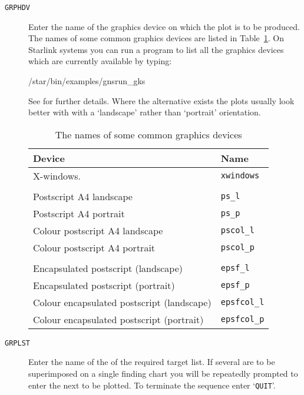 \documentclass[twoside,11pt]{starlink}
\begin{document}
\begin{description}

  \item[ \texttt{GRPHDV} ] Enter the name of the graphics device on which
   the plot is to be produced.  The names of some common graphics
   devices are listed in Table~\ref{GRPHDV}.  On Starlink systems you
   can run a program to list all the graphics devices which are
   currently available by typing:

  \begin{terminalv}
/star/bin/examples/gnsrun_gks
  \end{terminalv}

   See \cite{SUN57} for further details.  Where
   the alternative exists the plots usually look better with with a
   `landscape' rather than `portrait' orientation.

  \begin{table}[htbp]

  \begin{center}
  \begin{tabular}{ll}
   Device                         & Name             \\ \hline
   X-windows.                     & \texttt{xwindows}   \\
                                  & \\
   Postscript A4 landscape        & \texttt{ps\_l}      \\
   Postscript A4 portrait         & \texttt{ps\_p}      \\
   Colour postscript A4 landscape & \texttt{pscol\_l}   \\
   Colour postscript A4 portrait  & \texttt{pscol\_p}   \\
                                  & \\
   Encapsulated postscript (landscape)        & \texttt{epsf\_l}    \\
   Encapsulated postscript (portrait)         & \texttt{epsf\_p}    \\
   Colour encapsulated postscript (landscape) & \texttt{epsfcol\_l} \\
   Colour encapsulated postscript (portrait)  & \texttt{epsfcol\_p} \\
  \end{tabular}
  \end{center}

  \caption{The names of some common graphics devices \label{GRPHDV} }

  \end{table}

  \item[ \texttt{GRPLST} ] Enter the name of the of the required target
   list.  If several are to be superimposed on a single finding chart
   you will be repeatedly prompted to enter the next to be plotted.
   To terminate the sequence enter `\texttt{QUIT}'.

\end{description}
\end{document}
